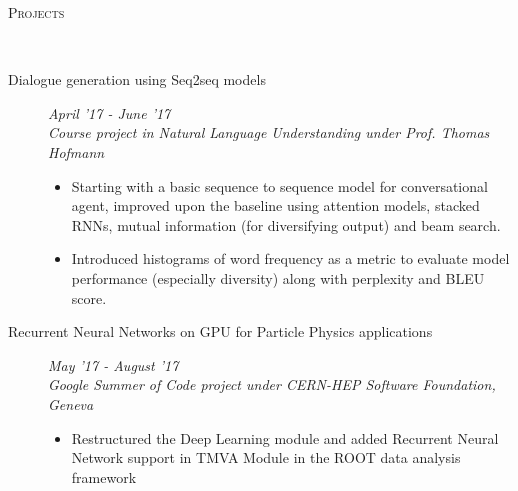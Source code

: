 \documentclass[9pt]{article}
\newenvironment{changemargin}[2]{%
  \begin{list}{}{%
      \setlength{\topsep}{0pt}%
    \setlength{\leftmargin}{#1}%
    \setlength{\rightmargin}{#2}%
    \setlength{\listparindent}{\parindent}%
  \setlength{\itemindent}{\parindent}%
    \setlength{\parsep}{\parskip}%
    }%
  \item[]}{\end{list}
    }
\newcommand{\lineover}{
  \begin{changemargin}{-0.05in}{-0.10in}
    \vspace*{-9pt}
    \hrulefill \\
    \vspace*{-2pt}
  \end{changemargin}
}
\newcommand{\header}[1]{
  \begin{changemargin}{-0.5in}{-0.5in}
    \scshape{#1}\\
        \lineover
  \end{changemargin}
}
\newenvironment{body} {
  \vspace*{-16pt}
        \begin{changemargin}{-0.6in}{-0.65in}
        }	
        {\end{changemargin}
}
\begin{document}
\header{Projects}
\begin{body}
  \vspace{14pt}

  \begin{description}
    \item[\normalsize{Dialogue generation using Seq2seq models}] \hfill \textit{April '17 - June '17} \\
      \textit{Course project in Natural Language Understanding under Prof. Thomas Hofmann}
      \begin{itemize}
        \item Starting with a basic sequence to sequence model for conversational
          agent, improved upon the baseline using attention models, stacked RNNs,
          mutual information (for diversifying output) and beam search.
        \item Introduced histograms of word frequency as a metric to evaluate 
          model performance (especially diversity) along with perplexity and BLEU 
          score.
      \end{itemize}

    \item[\normalsize{Recurrent Neural Networks on GPU for Particle Physics applications}] \hfill \textit{May '17 - August '17} \\
      \textit{Google Summer of Code project under CERN-HEP Software Foundation, Geneva}
      \begin{itemize}
        \item Restructured the Deep Learning module and added Recurrent Neural Network
          support in TMVA Module in the ROOT data analysis framework
      \end{itemize}


\end{description}
\end{body}
\end{document}
